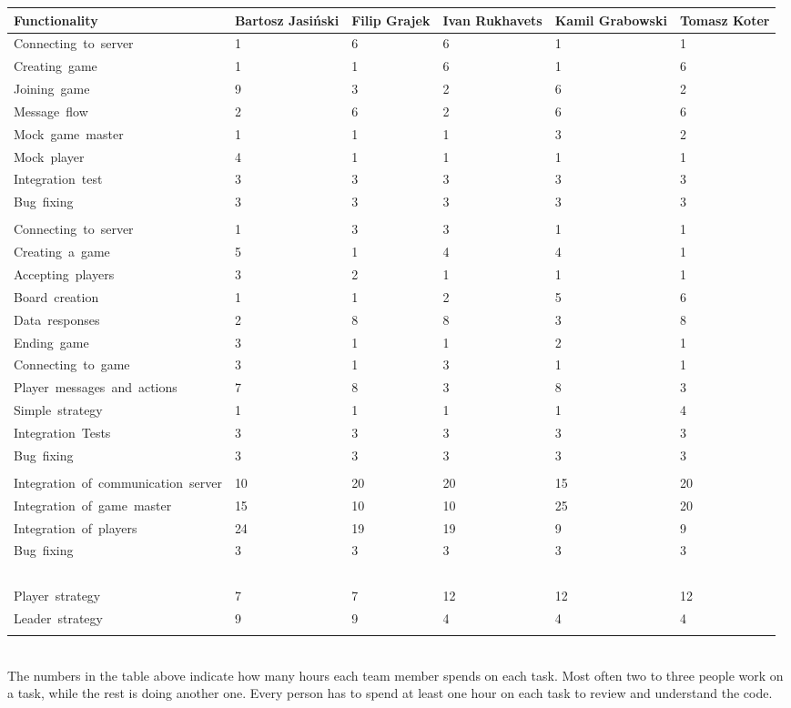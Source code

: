 \documentclass[11pt,a4paper]{article}
\begin{document}
\begin{tabular}{ | p{4cm} | p{2cm} | p{2cm} | p{2cm} | p{2cm} | p{2cm} | }
\hline
	\textbf{Functionality} & \textbf{Bartosz Jasiński} & \textbf{Filip Grajek} & \textbf{Ivan Rukhavets} & \textbf{Kamil Grabowski} & \textbf{Tomasz Koter}\\ \hline
	Connecting\ to\ server & 1 & 6 & 6 & 1 & 1   \\ \hline
	Creating\ game & 1 & 1 & 6 & 1 & 6   \\ \hline
	Joining\ game & 9 & 3 & 2 & 6 & 2   \\ \hline
	Message\ flow & 2 & 6 & 2 & 6 & 6   \\ \hline
	Mock\ game\ master & 1 & 1 & 1 & 3 & 2   \\ \hline
	Mock\ player & 4 & 1 & 1 & 1 & 1   \\ \hline
	Integration\ test & 3 & 3 & 3 & 3 & 3   \\ \hline
	Bug\ fixing & 3 & 3 & 3 & 3 & 3  \\ \hline
	 &  &  &  &  &   \\ \hline

	Connecting\ to\ server & 1 & 3 & 3 & 1 & 1    \\ \hline
	Creating\ a\ game & 5 & 1 & 4 & 4 & 1   \\ \hline
	Accepting\ players & 3 & 2 & 1 & 1 & 1   \\ \hline
	Board\ creation & 1 & 1 & 2 & 5 & 6    \\ \hline
	Data\ responses & 2 & 8 & 8 & 3 & 8   \\ \hline
	Ending\ game & 3 & 1 & 1 & 2 & 1   \\ \hline
	Connecting\ to\ game & 3 & 1 & 3 & 1 & 1   \\ \hline
	Player\ messages\ and\ actions & 7 & 8 & 3 & 8 & 3\  \\ \hline
	Simple\ strategy & 1 & 1 & 1 & 1 & 4   \\ \hline
	Integration\ Tests & 3 & 3 & 3 & 3 & 3   \\ \hline
	Bug\ fixing & 3 & 3 & 3 & 3 & 3   \\ \hline
	 &  &  &  &  &  \\ \hline
	
	Integration\ of\ communication\ server & 10 & 20 & 20 & 15 & 20   \\ \hline
	Integration\ of\ game\ master & 15 & 10 & 10 & 25 & 20    \\ \hline
	Integration\ of\ players & 24 & 19 & 19 & 9 & 9    \\ \hline
	Bug\ fixing & 3 & 3 & 3 & 3 & 3   \\ \hline
	\  & \  & \  & \  & \  &   \\ \hline
	Player\ strategy & 7 & 7 & 12 & 12 & 12   \\ \hline
	Leader\ strategy & 9 & 9 & 4 & 4 & 4 \\ \hline
	 &  &  &  &  &  \\ \hline
\end{tabular} \\

The numbers in the table above indicate how many hours each team member spends on each task. Most often two to three people work on a task, while the rest is doing another one. Every person has to spend at least one hour on each task to review and understand the code.
\end{document}
